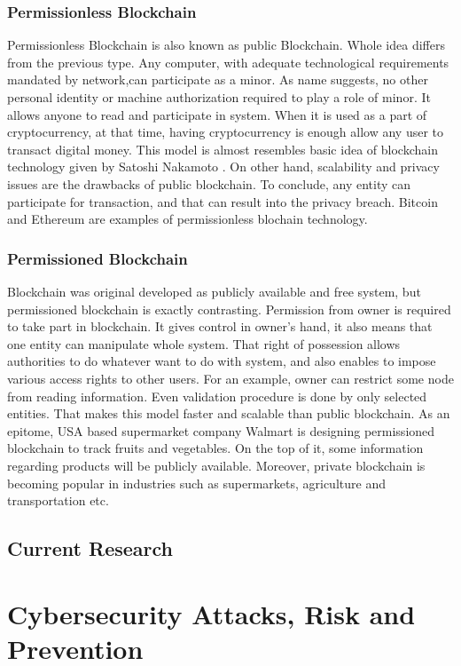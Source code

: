 \documentclass[a4paper,twoside,12pt]{report}
\begin{document}
\begin{spacing}{1.5}
\subsection{Permissionless Blockchain}
Permissionless Blockchain is also known as public Blockchain. Whole idea differs from the previous type. Any computer, with adequate technological requirements mandated by network,can participate as a minor. As name suggests, no other personal identity or machine authorization required to play a role of minor. It allows anyone to read and participate in system. When it is used as a part of cryptocurrency, at that time, having cryptocurrency is enough allow any user to transact digital money. This model is almost resembles basic idea of blockchain technology given by Satoshi Nakamoto \cite{satoshinakamoto}. On other hand, scalability and privacy issues are the drawbacks of public blockchain. To conclude, any entity can participate for transaction, and that can result into the privacy breach. Bitcoin and Ethereum are examples of permissionless blochain technology. 
\subsection{Permissioned Blockchain}
Blockchain was original developed as publicly available and free system, but permissioned blockchain is exactly contrasting. Permission from owner is required to take part in blockchain. It gives control in owner's hand, it also means that one entity can manipulate whole system. That right of possession allows authorities to do whatever want to do with system, and also enables to impose various access rights to other users. For an example, owner can restrict some node from reading information. Even validation procedure is done by only selected entities. That makes this model faster and scalable than public blockchain. As an epitome, USA based supermarket company Walmart is designing permissioned blockchain to track fruits and vegetables. On the top of it, some information regarding products will be publicly available. Moreover, private blockchain is becoming popular in industries such as supermarkets, agriculture and transportation etc.
\section{Current Research}
\cite{fangfangdai}
\chapter{Cybersecurity Attacks, Risk and Prevention}
\label{chapter3}

\end{spacing}
\end{document}
